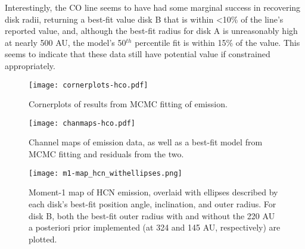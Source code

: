 Interestingly, the CO line seems to have had some marginal success in recovering disk radii, returning a best-fit value disk B that is within \textless10\% of the \hco line's reported value, and, although the best-fit radius for disk A is unreasonably high at nearly 500 AU, the model's 50$^{th}$ percentile fit is within 15\% of the \hco value. This seems to indicate that these data still have potential value if constrained appropriately.













\begin{figure}[htp]
  \hspace*{\fill}%
  \texttt{[image: cornerplots-hco.pdf]}\hfill%
  \hspace*{\fill}%
  \caption{Cornerplots of results from MCMC fitting of \hco emission.}
  \label{fig:hco_cornerplots}
\end{figure}



\begin{figure}[htp]
  \hspace*{\fill}%
  \texttt{[image: chanmaps-hco.pdf]}\hfill%
  \hspace*{\fill}%
  \caption{Channel maps of \hco emission data, as well as a best-fit model from MCMC fitting and residuals from the two.}
  \label{fig:hco_chanmaps}
\end{figure}


\begin{figure}[htp]
  \hspace*{\fill}%
  \texttt{[image: m1-map\_hcn\_withellipses.png]}\hfill%
  \hspace*{\fill}%
  \caption{Moment-1 map of HCN emission, overlaid with ellipses described by each disk's best-fit position angle, inclination, and outer radius. For disk B, both the best-fit outer radius with and without the 220 AU a posteriori prior implemented (at 324 and 145 AU, respectively) are plotted.}
  \label{fig:hcn_m1_ellipses}
\end{figure}


